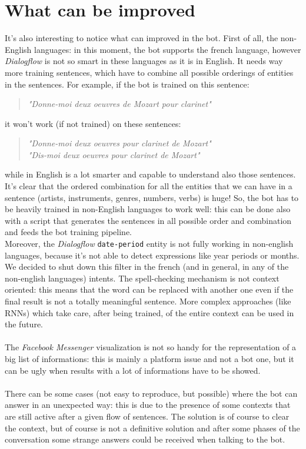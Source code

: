 \documentclass[a4paper,12pt]{report}
\begin{document}
	\section{What can be improved}
	It's also interesting to notice what can improved in the bot. First of all, the non-English languages: in this moment, the bot supports the french language, however \textit{Dialogflow} is not so smart in these languages as it is in English. It needs way more training sentences, which have to combine all possible orderings of entities in the sentences. For example, if the bot is trained on this sentence:
	\begin{verse}
		\textit{"Donne-moi deux oeuvres de Mozart pour clarinet"}
	\end{verse}
	it won't work (if not trained) on these sentences:
	\begin{verse}
		\textit{"Donne-moi deux oeuvres pour clarinet de Mozart"}\\
		\textit{"Dis-moi deux oeuvres pour clarinet de Mozart"}
	\end{verse}
	while in English is a lot smarter and capable to understand also those sentences. It's clear that the ordered combination for all the entities that we can have in a sentence (artists, instruments, genres, numbers, verbs) is huge! So, the bot has to be heavily trained in non-English languages to work well: this can be done also with a script that generates the sentences in all possible order and combination and feeds the bot training pipeline.\\
	Moreover, the \textit{Dialogflow} \texttt{date-period} entity is not fully working in non-english languages, because it's not able to detect expressions like year periods or months. We decided to shut down this filter in the french (and in general, in any of the non-english languages) intents.
	The spell-checking mechanism is not context oriented: this means that the word can be replaced with another one even if the final result is not a totally meaningful sentence. More complex approaches (like RNNs) which take care, after being trained, of the entire context can be used in the future.\\\\
	The \textit{Facebook Messenger} visualization is not so handy for the representation of a big list of informations: this is mainly a platform issue and not a bot one, but it can be ugly when results with a lot of informations have to be showed.\\\\
	There can be some cases (not easy to reproduce, but possible) where the bot can answer in an unexpected way: this is due to the presence of some contexts that are still active after a given flow of sentences. The solution is of course to clear the context, but of course is not a definitive solution and after some phases of the conversation some strange answers could be received when talking to the bot.\\\\
\end{document}
